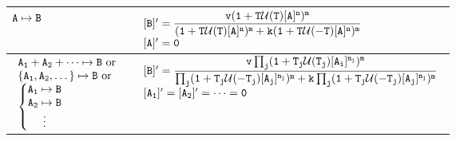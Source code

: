 \documentclass[12pt,letterpaper]{article}
\begin{document}
\begin{center}
\begin{tabular}{|p{1.5in}|p{4.5in}|}
\hline
${\tt A \mapsto B}$&
$\begin{array}{l}
{\tt [B]'=\dfrac{v(1+T\mathcal{U}(T)[A]^n)^m}{(1+T\mathcal{U}(T) [A]^n)^m + k (1+T\mathcal{U}(-T) [A]^n)^m}}\\
{\tt [A]'=0}
\end{array}$
\\\hline
$
\begin{array}{l}
	{\tt A_1 + A_2 + \cdots \mapsto B} \text{ or }\\
	{\tt \{A_1,A_2,\dots\} \mapsto B} \text{ or } \\
	\left\{
		\begin{matrix}
			{\tt A_1 \mapsto B}\\
			{\tt A_2 \mapsto B}\\
			\vdots
		\end{matrix}
	\right .
\end{array}
$ &
$
\begin{array}{l}
	{\tt [B]' =
\dfrac{v\prod_j (1+T_j\mathcal{U}(T_j)[A_i]^{n_j})^m}
{\prod_j (1+T_j\mathcal{U}(-T_j)[A_j]^{n_j})^m + k \prod_j (1+T_j\mathcal{U}(-T_j)[A_j]^{n_j})^m}	
	 } \\
	{\tt [A_1]'=[A_2]'=\cdots = 0}
\end{array}
$
\\ \hline
\end{tabular}
\end{center}

\pagebreak
\end{document}
